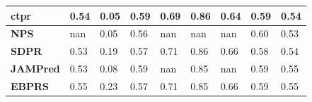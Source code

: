 \documentclass[pdflatex,sn-nature]{sn-jnl}%
\begin{document}
\begin{table}[!ht]
{\begin{tabular}{|l|l|l|l|l|l|l|l|l|}
\textbf{ctpr}   \cite{Chung_2019}             & \cellcolor[HTML]{F1E784}0.54 & \cellcolor[HTML]{F97E6F}0.05 & \cellcolor[HTML]{FEE783}0.59 & \cellcolor[HTML]{FDD47F}0.69                                                     & \cellcolor[HTML]{F6E984}0.86                                         & \cellcolor[HTML]{FFEB84}0.64                                                 & \cellcolor[HTML]{FBB179}0.59                                                    & \cellcolor[HTML]{FEE683}0.54 \\ \hline
\textbf{NPS}    \cite{Chun_2020}             & nan                          & \cellcolor[HTML]{F87B6E}0.05 & \cellcolor[HTML]{FBA676}0.56 & nan                                                                              & nan                                                                  & nan                                                                          & \cellcolor[HTML]{F8E984}0.60                                                    & \cellcolor[HTML]{FA9673}0.53 \\ \hline
\textbf{SDPR}    \cite{Zhou_2021}            & \cellcolor[HTML]{FFEB84}0.53 & \cellcolor[HTML]{FDD37F}0.19 & \cellcolor[HTML]{FDCE7E}0.57 & \cellcolor[HTML]{E5E483}0.71                                                     & \cellcolor[HTML]{FEE883}0.86                                         & \cellcolor[HTML]{83C87D}0.66                                                 & \cellcolor[HTML]{F98570}0.58                                                    & \cellcolor[HTML]{FFEB84}0.54 \\ \hline
\textbf{JAMPred}     \cite{Newcombe_2019}        & \cellcolor[HTML]{FEE883}0.53 & \cellcolor[HTML]{FA8F72}0.08 & \cellcolor[HTML]{FEE983}0.59 & nan                                                                              & \cellcolor[HTML]{FEE683}0.85                                         & nan                                                                          & \cellcolor[HTML]{FEEB84}0.59                                                    & \cellcolor[HTML]{E2E383}0.55 \\ \hline
\textbf{EBPRS}   \cite{Song_2020}            & \cellcolor[HTML]{CBDC81}0.55 & \cellcolor[HTML]{FEE883}0.23 & \cellcolor[HTML]{FCBC7A}0.57 & \cellcolor[HTML]{EAE583}0.71                                                     & \cellcolor[HTML]{FEE583}0.85                                         & \cellcolor[HTML]{86C97E}0.66                                                 & \cellcolor[HTML]{FEE182}0.59                                                    & \cellcolor[HTML]{E1E383}0.55 \\ \hline

\end{tabular}}
\end{table}
\end{document}
